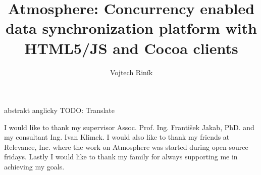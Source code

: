 \documentclass[]{tukethesis}
\author{Vojtech Riník}
\title{Atmosphere: Concurrency enabled data synchronization platform with HTML5/JS and Cocoa clients}
\subtitle{}
\begin{document}
\renewcommand\theHfigure{\theHsection.\arabic{figure}}
\renewcommand\theHtable{\theHsection.\arabic{table}}

\firstpage

\titlepage


% 
% 

\abstrakte %
abstrakt anglicky
\abstrakt %
TODO: Translate
\endabstract %

\assignthesis

\declaration

\acknowledgement %
I would like to thank my supervisor Assoc. Prof. Ing. František Jakab, PhD. and my consultant Ing. Ivan Klimek. I would also like to thank my friends at Relevance, Inc. where the work on Atmosphere was started during open-source fridays. Lastly I would like to thank my family for always supporting me in achieving my goals.
\endacknowledgement
\end{document}
